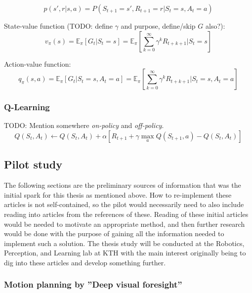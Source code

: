 \begin{equation}
    p(s', r|s, a) = P(S_{t+1} = s', R_{t+1} = r | S_t = s, A_t = a)
\end{equation}

State-value function (TODO: define $\gamma$ and purpose, define/skip $G$ also?):
\begin{equation}
    v_\pi(s) = \mathbb{E}_\pi\left[G_t|S_t=s\right] = \mathbb{E}_\pi\left[\sum_{k=0}^\infty \gamma^k R_{t+k+1}|S_t=s\right]
\end{equation}

Action-value function:
\begin{equation}
    q_\pi(s, a) = \mathbb{E}_\pi\left[G_t|S_t=s,A_t=a\right] = \mathbb{E}_\pi\left[\sum_{k=0}^\infty \gamma^k R_{t+k+1}|S_t=s,A_t=a\right]
\end{equation}


\subsubsection{Q-Learning}
TODO: Mention somewhere \textit{on-policy} and \textit{off-policy}.
\begin{equation}
    Q(S_t, A_t) \leftarrow Q(S_t, A_t) + \alpha \left[ R_{t+1} + \gamma \max_a Q(S_{t+1}, a) - Q(S_t, A_t) \right]
\end{equation}

\subsection{Pilot study}

The following sections are the preliminary sources of information that was the
initial spark for this thesis as mentioned above. How to re-implement these
articles is not self-contained, so the pilot would necessarily need to also
include reading into articles from the references of these. Reading of these
initial articles would be needed to motivate an appropriate method, and then
further research would be done with the purpose of gaining all the information
needed to implement such a solution. The thesis study will be conducted at the
Robotics, Perception, and Learning lab at KTH with the main interest originally
being to dig into these articles and develop something further.

\subsubsection{Motion planning by ''Deep visual foresight''}

